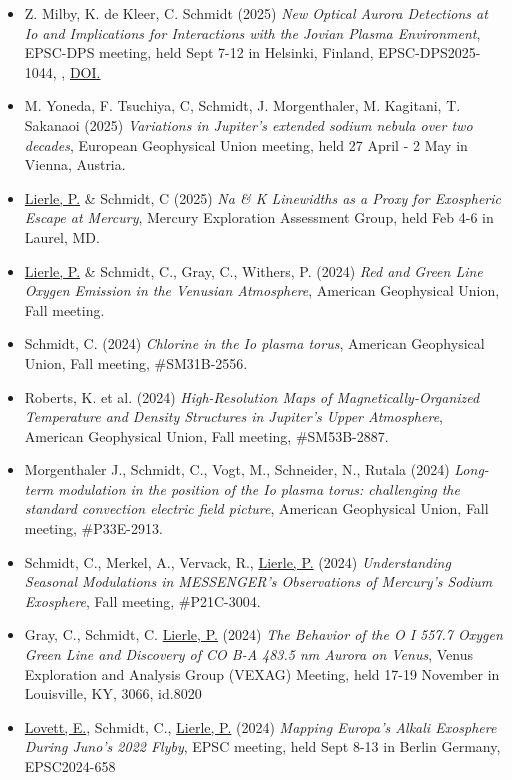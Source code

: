 \documentclass[12pt]{report}
\begin{document}
\begin{itemize}
   \item Z. Milby, K. de Kleer, C. Schmidt (2025) \textit{New Optical Aurora Detections at Io and Implications for Interactions with the Jovian Plasma Environment}, EPSC-DPS meeting, held Sept 7-12 in Helsinki, Finland, EPSC-DPS2025-1044, , \href{, https://doi.org/10.5194/epsc-dps2025-1044}{DOI.}
   \item M. Yoneda, F. Tsuchiya, C, Schmidt, J. Morgenthaler, M. Kagitani, T. Sakanaoi (2025) \textit{Variations in Jupiter's extended sodium nebula over two decades}, European Geophysical Union meeting, held 27 April -  2 May in Vienna, Austria.
   \item \underline{Lierle, P.} \& Schmidt, C (2025) \textit{Na \& K Linewidths as a Proxy for Exospheric Escape at Mercury}, Mercury Exploration Assessment Group, held Feb 4-6 in Laurel, MD.
   \item \underline{Lierle, P.} \& Schmidt, C., Gray, C., Withers, P. (2024) \textit{Red and Green Line Oxygen Emission in the Venusian Atmosphere}, American Geophysical Union, Fall meeting.
   \item Schmidt, C. (2024) \textit{Chlorine in the Io plasma torus}, American Geophysical Union, Fall meeting, \#SM31B-2556.
   \item Roberts, K. et al. (2024) \textit{High-Resolution Maps of Magnetically-Organized Temperature and Density Structures in Jupiter’s Upper Atmosphere}, American Geophysical Union, Fall meeting, \#SM53B-2887.
   \item Morgenthaler J., Schmidt, C., Vogt, M., Schneider, N., Rutala (2024) \textit{Long-term modulation in the position of the Io plasma torus: challenging the standard convection electric field picture}, American Geophysical Union, Fall meeting, \#P33E-2913.
   \item Schmidt, C., Merkel, A., Vervack, R., \underline{Lierle, P.} (2024) \textit{Understanding Seasonal Modulations in MESSENGER’s Observations of Mercury’s Sodium Exosphere}, Fall meeting, \#P21C-3004.
   \item Gray, C., Schmidt, C. \underline{Lierle, P.} (2024) \textit{The Behavior of the O I 557.7 Oxygen Green Line and Discovery of CO B-A 483.5 nm Aurora on Venus}, Venus Exploration and Analysis Group (VEXAG) Meeting, held 17-19 November in Louisville, KY, 3066, id.8020
   \item \underline{Lovett, E.}, Schmidt, C., \underline{Lierle, P.} (2024) \textit{Mapping Europa's Alkali Exosphere During Juno's 2022 Flyby}, EPSC meeting, held Sept 8-13 in Berlin Germany, EPSC2024-658

\end{itemize}
\end{document}
